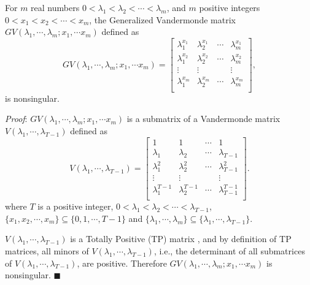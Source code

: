 \documentclass[../thesis.tex]{subfiles}
\begin{document}
\begin{lem} \label{lem:gv}
For $m$ real numbers $0< \lambda_1 < \lambda_2 < \cdots < \lambda_m$, and $m$ positive integers $0< x_1 < x_2 < \cdots < x_m$, the Generalized Vandermonde matrix $GV(\lambda_1, \cdots, \lambda_m; x_1, \cdots x_m)$ defined as
\begin{equation}
GV(\lambda_1, \cdots, \lambda_m; x_1, \cdots x_m) = 
	\begin{bmatrix} \lambda_1^{x_1} & \lambda_2^{x_1} & \cdots & \lambda_m^{x_1} \\
			\lambda_1^{x_2} & \lambda_2^{x_2} & \cdots & \lambda_m^{x_2} \\
			\vdots & \vdots  & & \vdots\\
			\lambda_1^{x_m} & \lambda_2^{x_m} & \cdots & \lambda_m^{x_m} \\
	\end{bmatrix},
	\end{equation}\nonumber
is nonsingular.
\end{lem}

\textit{Proof}:
$GV(\lambda_1, \cdots, \lambda_m; x_1, \cdots x_m)$ is a submatrix of a Vandermonde matrix $V(\lambda_1, \cdots, \lambda_{T-1})$ defined as
\begin{equation}
V(\lambda_1, \cdots, \lambda_{T-1}) = 
	\begin{bmatrix}1 & 1 & \cdots & 1 \\
			\lambda_1 & \lambda_2 & \cdots & \lambda_{T-1} \\
			\lambda_1^{2} & \lambda_2^{2} & \cdots & \lambda_{T-1}^{2} \\
			\vdots & \vdots  & & \vdots\\
			\lambda_1^{T-1} & \lambda_2^{T-1} & \cdots & \lambda_{T-1}^{T-1} \\
	\end{bmatrix}.
	\end{equation}\nonumber
where $T$ is a positive integer, $0< \lambda_1 < \lambda_2 < \cdots < \lambda_{T-1}$, $\{x_1, x_2, \cdots, x_m\} \subseteq \{0, 1, \cdots, T-1\}$ and $\{ \lambda_1,\cdots, \lambda_m\} \subseteq \{ \lambda_1,\cdots, \lambda_{T-1}\} $.

$V(\lambda_1, \cdots, \lambda_{T-1})$ is a Totally Positive (TP) matrix \cite{fallat2011tnm}, and by definition of TP matrices, all minors of $V(\lambda_1, \cdots, \lambda_{T-1})$, i.e., the determinant of all submatrices of $V(\lambda_1, \cdots, \lambda_{T-1})$, are positive. Therefore $GV(\lambda_1, \cdots, \lambda_m; x_1, \cdots x_m) $ is nonsingular.
\hfill$\blacksquare$\\
\end{document}
